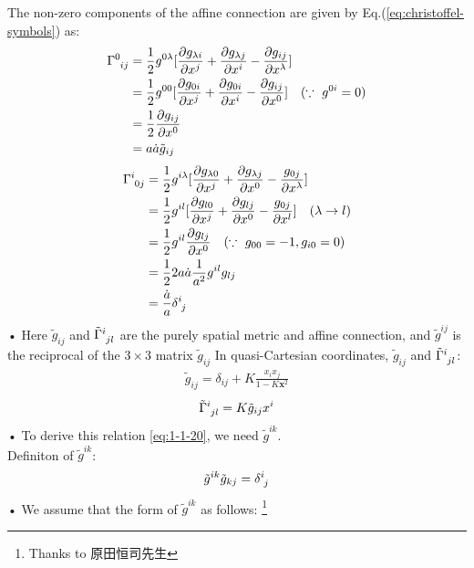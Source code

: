 \documentclass[11pt,a4paper,dvipdfmx]{jsarticle}
\theoremstyle{plain}
\theoremstyle{break}
\newcommand{\mbx}{\mathbf{x}}
\newcommand{\tensorGamma}[1]{\tensor{\Gamma}{ #1}}
\begin{document}
The non-zero components of the affine connection are given by Eq.(\ref{eq:christoffel-symbols}) as:
\begin{align}
  \tensorGamma{^{0}_{ij}}
  &=\frac{1}{2}g^{0\lambda}[\frac{\partial g_{\lambda i}}{\partial x^j} + \frac{\partial g_{\lambda j}}{\partial x^i} -\frac{\partial g_{ij}}{\partial x^\lambda}] \\
  &=\frac{1}{2} g^{00}[\frac{\partial g_{0i}}{\partial x^j} + \frac{\partial g_{0i}}{\partial x^i} -\frac{\partial g_{ij}}{\partial x^0}]\quad(\because\,\,g^{0i}=0)\\
  &=\frac{1}{2} \frac{\partial g_{ij}}{\partial x^0}\\
  &=a \dot{a} \tilde{g}_{ij}
\end{align}
\begin{align}
  \tensorGamma{^{i}_{0j}}
  &=\frac{1}{2}g^{i \lambda}[\frac{\partial g_{\lambda 0}}{\partial x^j}+\frac{\partial g_{\lambda j}}{\partial x^0} -\frac{g_{0j}}{\partial x^\lambda}] \\
  &=\frac{1}{2}g^{i l}[\frac{\partial g_{l 0}}{\partial x^j}+\frac{\partial g_{l j}}{\partial x^0} -\frac{g_{0j}}{\partial x^l}]\quad(\lambda \to l)\\
  &=\frac{1}{2}g^{i l}\frac{\partial g_{lj}}{\partial x^0} \quad(\because\,\,g_{00}=-1,g_{i0}=0)\\
  &=\frac{1}{2} 2 a \dot{a}\frac{1}{a^2}g^{il}g_{lj}\\
  &=\frac{\dot{a}}{a} \tensor{\delta}{^i_j}
\end{align}•%
Here $\tilde{g}_{ij}$ and $\tensor{\tilde{\Gamma}}{^{i}_{jl}}$ are the purely spatial metric and affine connection, and  $\tilde{g}^{ij}$ is the reciprocal of the $3\times3$ matrix $\tilde{g}_{ij}$
In quasi-Cartesian coordinates, $\tilde{g}_{ij}$ and $\tensor{\tilde{\Gamma}}{^{i}_{jl}}$:
\begin{align}
\tilde{g}_{ij} = \delta_{ij} + K \frac{x_i x_j}{1-K\mbx^2}
\end{align}
\begin{align}
\tensor{\tilde{\Gamma}}{^{i}_{jl}} = K \tilde{g}_{ij} x^i \label{eq:1-1-20}
\end{align}•%
To derive this relation \eqref{eq:1-1-20}, we need $\tilde{g}^{ik}$.\\
Definiton of $\tilde{g}^{ik}$:
\begin{align}
\tilde{g}^{ik}\tilde{g}_{kj} = \tensor{\delta}{^i_j}
\end{align}•%
We assume that the form of $\tilde{g}^{ik}$ as follows: \footnote{Thanks to 原田恒司先生}
\end{document}
